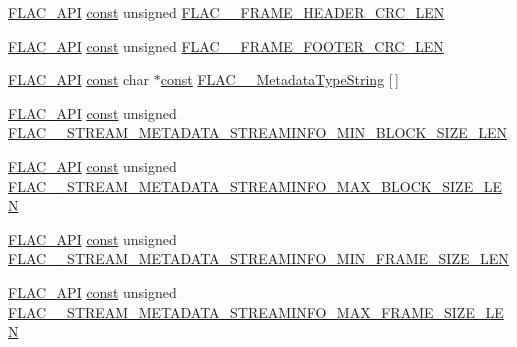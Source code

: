 \begin{DoxyCompactItemize}
\item 
\hyperlink{group__flac__export_ga56ca07df8a23310707732b1c0007d6f5}{F\+L\+A\+C\+\_\+\+A\+PI} \hyperlink{getopt1_8c_a2c212835823e3c54a8ab6d95c652660e}{const} unsigned \hyperlink{group__flac__format_ga85cca90abf67913469818af77256d32d}{F\+L\+A\+C\+\_\+\+\_\+\+F\+R\+A\+M\+E\+\_\+\+H\+E\+A\+D\+E\+R\+\_\+\+C\+R\+C\+\_\+\+L\+EN}
\item 
\hyperlink{group__flac__export_ga56ca07df8a23310707732b1c0007d6f5}{F\+L\+A\+C\+\_\+\+A\+PI} \hyperlink{getopt1_8c_a2c212835823e3c54a8ab6d95c652660e}{const} unsigned \hyperlink{group__flac__format_gad60e31ade8c94bae295828c8c6f74367}{F\+L\+A\+C\+\_\+\+\_\+\+F\+R\+A\+M\+E\+\_\+\+F\+O\+O\+T\+E\+R\+\_\+\+C\+R\+C\+\_\+\+L\+EN}
\item 
\hyperlink{group__flac__export_ga56ca07df8a23310707732b1c0007d6f5}{F\+L\+A\+C\+\_\+\+A\+PI} \hyperlink{getopt1_8c_a2c212835823e3c54a8ab6d95c652660e}{const} char $\ast$\hyperlink{getopt1_8c_a2c212835823e3c54a8ab6d95c652660e}{const} \hyperlink{group__flac__format_gaf1ee427883bf9ecc219c25834e89a0ee}{F\+L\+A\+C\+\_\+\+\_\+\+Metadata\+Type\+String} \mbox{[}$\,$\mbox{]}
\item 
\hyperlink{group__flac__export_ga56ca07df8a23310707732b1c0007d6f5}{F\+L\+A\+C\+\_\+\+A\+PI} \hyperlink{getopt1_8c_a2c212835823e3c54a8ab6d95c652660e}{const} unsigned \hyperlink{group__flac__format_ga196acfb0e7311915ce5528279b717115}{F\+L\+A\+C\+\_\+\+\_\+\+S\+T\+R\+E\+A\+M\+\_\+\+M\+E\+T\+A\+D\+A\+T\+A\+\_\+\+S\+T\+R\+E\+A\+M\+I\+N\+F\+O\+\_\+\+M\+I\+N\+\_\+\+B\+L\+O\+C\+K\+\_\+\+S\+I\+Z\+E\+\_\+\+L\+EN}
\item 
\hyperlink{group__flac__export_ga56ca07df8a23310707732b1c0007d6f5}{F\+L\+A\+C\+\_\+\+A\+PI} \hyperlink{getopt1_8c_a2c212835823e3c54a8ab6d95c652660e}{const} unsigned \hyperlink{group__flac__format_ga6f069aa2f887122aa88f65e5fae2f0e7}{F\+L\+A\+C\+\_\+\+\_\+\+S\+T\+R\+E\+A\+M\+\_\+\+M\+E\+T\+A\+D\+A\+T\+A\+\_\+\+S\+T\+R\+E\+A\+M\+I\+N\+F\+O\+\_\+\+M\+A\+X\+\_\+\+B\+L\+O\+C\+K\+\_\+\+S\+I\+Z\+E\+\_\+\+L\+EN}
\item 
\hyperlink{group__flac__export_ga56ca07df8a23310707732b1c0007d6f5}{F\+L\+A\+C\+\_\+\+A\+PI} \hyperlink{getopt1_8c_a2c212835823e3c54a8ab6d95c652660e}{const} unsigned \hyperlink{group__flac__format_ga0bdf42bf21ece52817dbc3d70c3cf73f}{F\+L\+A\+C\+\_\+\+\_\+\+S\+T\+R\+E\+A\+M\+\_\+\+M\+E\+T\+A\+D\+A\+T\+A\+\_\+\+S\+T\+R\+E\+A\+M\+I\+N\+F\+O\+\_\+\+M\+I\+N\+\_\+\+F\+R\+A\+M\+E\+\_\+\+S\+I\+Z\+E\+\_\+\+L\+EN}
\item 
\hyperlink{group__flac__export_ga56ca07df8a23310707732b1c0007d6f5}{F\+L\+A\+C\+\_\+\+A\+PI} \hyperlink{getopt1_8c_a2c212835823e3c54a8ab6d95c652660e}{const} unsigned \hyperlink{group__flac__format_gaa206d2c029642f1ad22b101f071d010b}{F\+L\+A\+C\+\_\+\+\_\+\+S\+T\+R\+E\+A\+M\+\_\+\+M\+E\+T\+A\+D\+A\+T\+A\+\_\+\+S\+T\+R\+E\+A\+M\+I\+N\+F\+O\+\_\+\+M\+A\+X\+\_\+\+F\+R\+A\+M\+E\+\_\+\+S\+I\+Z\+E\+\_\+\+L\+EN}

\end{DoxyCompactItemize}
